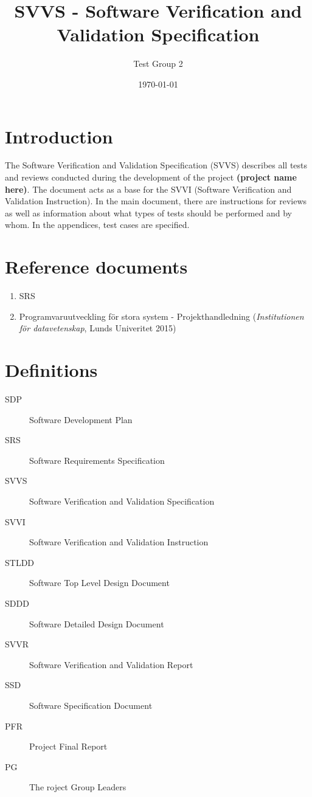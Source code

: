 \documentclass[a4paper]{article}
\title{SVVS - Software Verification and Validation Specification}
\date{\today}
\author{Test Group 2}
\begin{document}
\maketitle


\pagebreak
\setcounter{tocdepth}{2}
\tableofcontents
\pagebreak


\section{Introduction}
The Software Verification and Validation Specification (SVVS) describes all tests and reviews conducted during the development of the project \textbf{(project name here)}. The document acts as a base for the SVVI (Software Verification and Validation Instruction).
In the main document, there are instructions for reviews as well as information about what types of tests should be performed and by whom. In the appendices, test cases are specified.

\section{Reference documents}
\begin{enumerate}
\item SRS \label{refdocs:srs}
\item Programvaruutveckling för stora system - Projekthandledning (\textit{Institutionen för datavetenskap}, Lunds Univeritet 2015) \label{refdocs:projekthandledning}
\end{enumerate}

\section{Definitions}
\begin{description}
\item[SDP] Software Development Plan
\item[SRS] Software Requirements Specification
\item[SVVS] Software Verification and Validation Specification
\item[SVVI] Software Verification and Validation Instruction
\item[STLDD] Software Top Level Design Document
\item[SDDD] Software Detailed Design Document
\item[SVVR] Software Verification and Validation Report
\item[SSD] Software Specification Document
\item[PFR] Project Final Report
\item[PG] The roject Group Leaders
\end{description}
\end{document}
